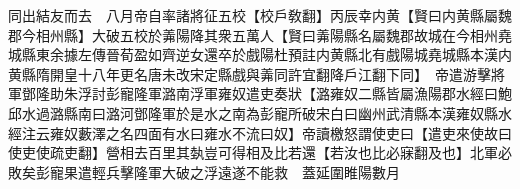 同出結友而去　八月帝自率諸將征五校【校戶敎翻】丙辰幸内黄【賢曰内黄縣屬魏郡今相州縣】大破五校於羛陽降其衆五萬人【賢曰羛陽縣名屬魏郡故城在今相州堯城縣東余據左傳晉荀盈如齊逆女還卒於戲陽杜預註内黄縣北有戲陽城堯城縣本漢内黄縣隋開皇十八年更名唐未改宋定縣戲與羛同許宜翻降戶江翻下同】　帝遣游擊將軍鄧隆助朱浮討彭寵隆軍潞南浮軍雍奴遣吏奏狀【潞雍奴二縣皆屬漁陽郡水經曰鮑邱水過潞縣南曰潞河鄧隆軍於是水之南為彭寵所破宋白曰幽州武清縣本漢雍奴縣水經注云雍奴藪澤之名四面有水曰雍水不流曰奴】帝讀檄怒謂使吏曰【遣吏來使故曰使吏使疏吏翻】營相去百里其埶豈可得相及比若還【若汝也比必寐翻及也】北軍必敗矣彭寵果遣輕兵擊隆軍大破之浮遠遂不能救　蓋延圍睢陽數月